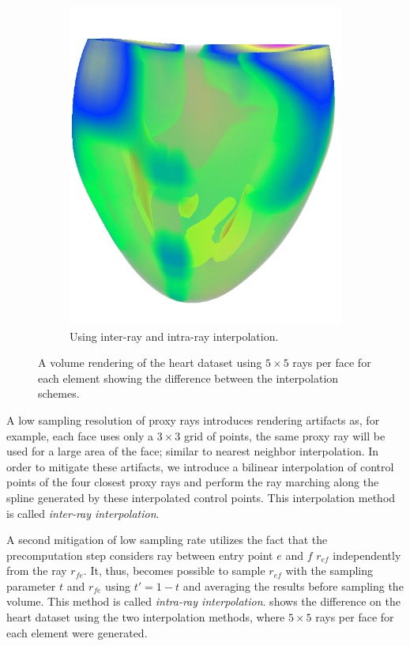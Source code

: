 \begin{figure}
\begin{subfigure}[b]{0.4\textwidth}
    \includegraphics[width=\abfboximagewidth]{figures/contributions/fem/heart-5-rr-ii.jpg}
    \caption{Using inter-ray and intra-ray interpolation.}
    \label{contributions:fem:interpolation}
\end{subfigure}
\caption{A volume rendering of the heart dataset using $5\times 5$ rays per face for each element showing the difference between the interpolation schemes.}
\label{contributions:fem:interpolationexample}
\end{figure}

A low sampling resolution of proxy rays introduces rendering artifacts as, for example, each face uses only a $3 \times 3$ grid of points, the same proxy ray will be used for a large area of the face; similar to nearest neighbor interpolation.  In order to mitigate these artifacts, we introduce a bilinear interpolation of control points of the four closest proxy rays and perform the ray marching along the spline generated by these interpolated control points.  This interpolation method is called \emph{inter-ray interpolation}.

A second mitigation of low sampling rate utilizes the fact that the precomputation step considers ray between entry point $e$ and $f$ $r_{ef}$ independently from the ray $r_{fe}$.  It, thus, becomes possible to sample $r_{ef}$ with the sampling parameter $t$ and $r_{fe}$ using $t' = 1 - t$ and averaging the results before sampling the volume.  This method is called \emph{intra-ray interpolation}.   shows the difference on the heart dataset using the two interpolation methods, where $5\times 5$ rays per face for each element were generated.






